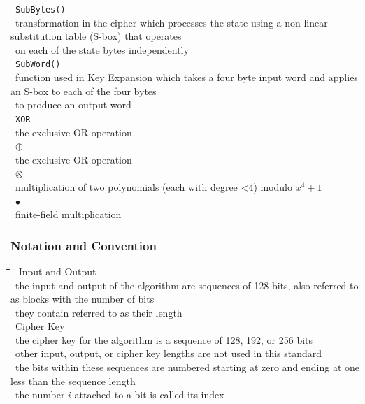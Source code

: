 \documentclass[10pt,letterpaper]{scrartcl}
\newcommand{\tbul}{\textbullet}
\newcommand{\tend}{\>\textendash}
\newcommand{\tabDef}{\hspace{2em}\=\hspace{2em}\=\hspace{2em}\=\hspace{2em}\=\kill}
\begin{document}
\begin{tabbing}
	\tbul\ \texttt{SubBytes()} \\
	\tend\ transformation in the cipher which processes the state using a non-linear substitution table (S-box) that operates\\ \>\ on each of the state bytes independently \\
	\tbul\ \texttt{SubWord()} \\
	\tend\ function used in Key Expansion which takes a four byte input word and applies an S-box to each of the four bytes\\ \>\ to produce an output word \\
	\tbul\ \texttt{XOR} \\
	\tend\ the exclusive-OR operation \\ 
	\tbul\ \texttt{$\oplus$} \\
	\tend\ the exclusive-OR operation \\
	\tbul\ \texttt{$\otimes$} \\
	\tend\ multiplication of two polynomials (each with degree \textless 4) modulo $x^4 + 1$ \\
	\tbul\ \texttt{$\bullet$} \\
	\tend\ finite-field multiplication\end{tabbing}
	\subsubsection*{Notation and Convention}\begin{tabbing}\tabDef
	\tbul\ Input and Output \\
	\tend\ the input and output of the algorithm are sequences of 128-bits, also referred to as blocks with the number of bits\\ \>\ they contain referred to as their length \\
	\tbul\ Cipher Key \\
	\tend\ the cipher key for the algorithm is a sequence of 128, 192, or 256 bits\\
	\tbul\ other input, output, or cipher key lengths are not used in this standard \\ 
	\tbul\ the bits within these sequences are numbered starting at zero and ending at one less than the sequence length \\
	\tbul\ the number $i$ attached to a bit is called its index\end{tabbing}
\end{document}
